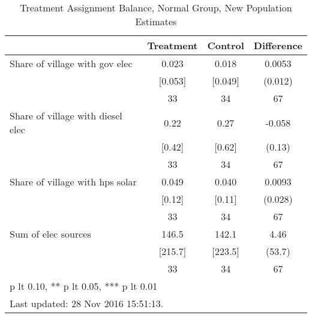 \begin{table}[htbp]\centering
\def\sym#1{\ifmmode^{#1}\else\(^{#1}\)\fi}
\caption{Treatment Assignment Balance, Normal Group, New Population Estimates \label{tab:"balance"}}
\begin{tabular*}{0.9\hsize}{@{\hskip\tabcolsep\extracolsep\fill}l*{1}{ccc}}
\toprule
                                &Treatment&  Control&Difference         \\
\midrule
Share of village with gov elec  &    0.023&    0.018&   0.0053         \\
                                &  [0.053]&  [0.049]&  (0.012)         \\
                                &       33&       34&       67         \\
Share of village with diesel elec&     0.22&     0.27&   -0.058         \\
                                &   [0.42]&   [0.62]&   (0.13)         \\
                                &       33&       34&       67         \\
Share of village with hps solar &    0.049&    0.040&   0.0093         \\
                                &   [0.12]&   [0.11]&  (0.028)         \\
                                &       33&       34&       67         \\
Sum of elec sources             &    146.5&    142.1&     4.46         \\
                                &  [215.7]&  [223.5]&   (53.7)         \\
                                &       33&       34&       67         \\
\bottomrule
\multicolumn{4}{l}{\footnotesize * p lt 0.10, ** p lt 0.05, *** p lt 0.01}\\
\multicolumn{4}{l}{\footnotesize Last updated: 28 Nov 2016 15:51:13.}\\
\end{tabular*}
\end{table}
